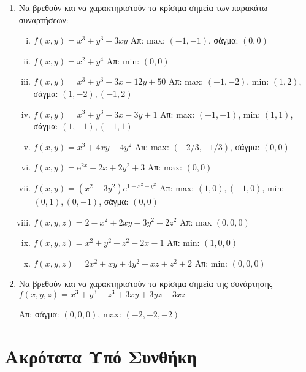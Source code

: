 \begin{enumerate}
  \item Να βρεθούν και να χαρακτηριστούν τα κρίσιμα σημεία  των παρακάτω συναρτήσεων:
    \begin{enumerate}[i)]
      \item $ f(x,y) = x^{3} + y^{3} + 3xy $ 
        \hfill Απ: max: $(-1,-1)  $, σάγμα: $ (0,0) $
      \item $ f(x,y) = x^{2}+y^{4} $ 
        \hfill Απ: min: $ (0,0) $ 
      \item $ f(x,y) = x^{3} + y^{3} - 3x -12y + 50 $ 
        \hfill Απ: max: $ (-1,-2)$, min: $ (1,2) $, 
        σάγμα: $ (1,-2), (-1,2) $
      \item $ f(x,y) = x^{3} + y^{3} -3x -3y + 1 $ 
        \hfill Απ: max: $(-1,-1)  $, min: $ (1,1) $,
        σάγμα: $ (1,-1), (-1,1) $
      \item $ f(x,y) = x^{3} + 4xy -4y^{2} $ 
        \hfill Απ: max: $ (-2/3, -1/3)  $, σάγμα: $ (0,0) $
      \item $ f(x,y) = \mathrm{e}^{2x} - 2x + 2y^{2} +3 $ \hfill Απ: max: $ (0,0) $  
      \item $ f(x,y) = (x^{2}-3y^{2})e^{1-x^{2}-y^{2}} $ 
        \hfill Απ: max: $ (1,0), (-1,0) $, min: $ (0,1), (0,-1) $, 
        σάγμα: $ (0,0) $
      \item $ f(x,y,z) = 2-x^{2}+2xy-3y^{2}-2z^{2} $ \hfill Απ:  max $ (0,0,0) $ 
      \item $ f(x,y,z) = x^{2}+y^{2}+z^{2}-2x-1 $ \hfill Απ:  min: $ (1,0,0) $ 
      \item $ f(x,y,z) = 2x^{2}+xy+4y^{2}+xz+z^{2}+2 $ \hfill Απ: min: $ (0,0,0) $ 
    \end{enumerate}

  \item Να βρεθούν και να χαρακτηριστούν τα κρίσιμα σημεία της συνάρτησης 
    $ f(x,y,z) = x^{3} + y^{3}+z^{3} + 3xy +3yz + 3xz $

    \hfill Απ: σάγμα: $(0,0,0)$, max: $(-2,-2,-2)$  
\end{enumerate}


\section*{Ακρότατα Υπό Συνθήκη}

